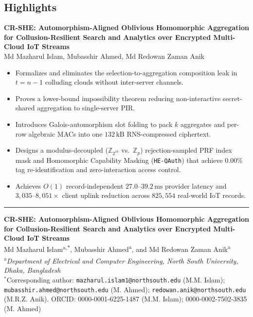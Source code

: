 \documentclass[11pt,a4paper]{article}
\begin{document}
\subsection*{Highlights}
\textbf{CR-SHE: Automorphism-Aligned Oblivious Homomorphic Aggregation for Collusion-Resilient Search and Analytics over Encrypted Multi-Cloud IoT Streams}\\[4pt]
Md Mazharul Islam, Mubasshir Ahmed, Md Redowan Zaman Anik

\begin{itemize}\setlength{\itemsep}{4pt}\setlength{\parskip}{0pt}
    \item Formalizes and eliminates the selection-to-aggregation composition leak in $t = n - 1$ colluding clouds without inter-server channels.
    \item Proves a lower-bound impossibility theorem reducing non-interactive secret-shared aggregation to single-server PIR.
    \item Introduces Galois-automorphism slot folding to pack $k$ aggregates and per-row algebraic MACs into one $132\,\text{kB}$ RNS-compressed ciphertext.
    \item Designs a modulus-decoupled ($\mathbb{Z}_{2^{16}}$ vs.\ $\mathbb{Z}_p$) rejection-sampled PRF index mask and Homomorphic Capability Masking (\texttt{HE-QAuth}) that achieve $0.00\%$ tag re-identification and zero-interaction access control.
    \item Achieves $O(1)$ record-independent $27.0\text{--}39.2\,\text{ms}$ provider latency and $3{,}035\text{--}8{,}051\times$ client uplink reduction across $825{,}554$ real-world IoT records.
\end{itemize}

\vspace{10pt}
\hrule
\vspace{12pt}

\begin{center}
    {\LARGE\bfseries\color{primary} CR-SHE: Automorphism-Aligned Oblivious Homomorphic Aggregation for Collusion-Resilient Search and Analytics over Encrypted Multi-Cloud IoT Streams}\\[10pt]
    {\large Md Mazharul Islam\textsuperscript{a,$*$}, Mubasshir Ahmed\textsuperscript{a}, and Md Redowan Zaman Anik\textsuperscript{a}}\\[4pt]
    {\small \textsuperscript{a}\textit{Department of Electrical and Computer Engineering, North South University, Dhaka, Bangladesh}}\\[2pt]
    {\footnotesize $^*$Corresponding author: \texttt{mazharul.islam1@northsouth.edu} (M.M. Islam); \texttt{mubasshir.ahmed@northsouth.edu} (M. Ahmed); \texttt{redowan.anik@northsouth.edu} (M.R.Z. Anik). ORCID: 0000-0001-6225-1487 (M.M. Islam); 0000-0002-7502-3835 (M. Ahmed)}
\end{center}
\end{document}
